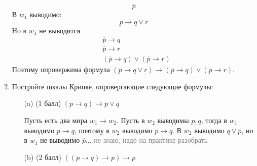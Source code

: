 \begin{enumerate}
\begin{solution}
\begin{equation}
            \overline{p}
        \end{equation}
        В $w_1$ выводимо:
        \begin{equation}
            \overline{p} \rightarrow q \lor r
        \end{equation}
        Но в $w_1$ не выводится
        \begin{align*}
            &\overline{p} \rightarrow q \\
            &\overline{p} \rightarrow r \\
            &(\overline{p} \rightarrow q) \lor (\overline{p} \rightarrow r)
        \end{align*}
        Поэтому опровержима формула $(\overline{p} \rightarrow q \lor r) \rightarrow (\overline{p} \rightarrow q) \lor (\overline{p} \rightarrow r)$.
    \end{solution}
    \item Постройте шкалы Крипке, опровергающие следующие формулы:
    \begin{itemize}
        \item[(a)] (1 балл) $(p \rightarrow q) \rightarrow \overline{p} \lor q$
        \begin{solution}
            Пусть есть два мира $w_1 \rightarrow w_2$. Пусть в $w_2$ выводимы $p, q$, тогда в $w_1$ выводимо $p \rightarrow q$, поэтому в $w_2$ выводимо $p \rightarrow q$. В $w_2$ выводимо $q \lor \overline{p}$, но в $w_1$ не выводимо $\overline{p}$... {\textcolor{gray}{не знаю, надо на практике разобрать}}
        \end{solution}
        \item[(b)] (2 балл) $((p \rightarrow q) \rightarrow p) \rightarrow p$
    \end{itemize}
\end{enumerate}
\clearpage
